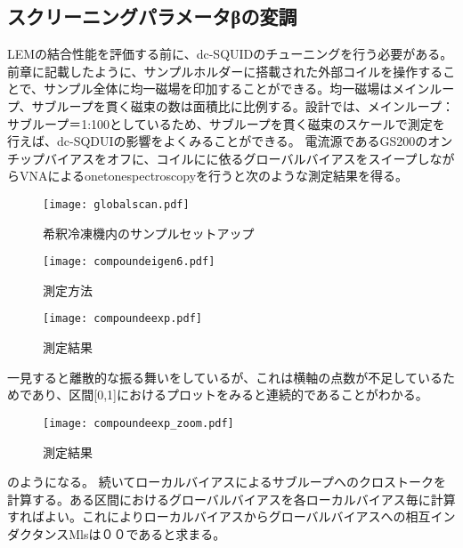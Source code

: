         \subsection{スクリーニングパラメータβの変調}
        LEMの結合性能を評価する前に、dc-SQUIDのチューニングを行う必要がある。前章に記載したように、サンプルホルダーに搭載された外部コイルを操作することで、サンプル全体に均一磁場を印加することができる。均一磁場はメインループ、サブループを貫く磁束の数は面積比に比例する。設計では、メインループ：サブループ＝1:100としているため、サブループを貫く磁束のスケールで測定を行えば、dc-SQDUIの影響をよくみることができる。
        電流源であるGS200のオンチップバイアスをオフに、コイルにに依るグローバルバイアスをスイープしながらVNAによるonetonespectroscopyを行うと次のような測定結果を得る。
        \begin{figure}[H]
            \begin{minipage}[t]{0.5\columnwidth}
                \centering
                \texttt{[image: globalscan.pdf]}
                \caption{希釈冷凍機内のサンプルセットアップ}
            \end{minipage}%
            \begin{minipage}[t]{0.5\columnwidth}
                \centering
                \texttt{[image: compoundeigen6.pdf]}
                \caption{測定方法}
            \end{minipage}
        \end{figure}
        
        \begin{figure}[H]
            \centering
            \texttt{[image: compoundeexp.pdf]}
            \caption{測定結果}
        \end{figure}
        一見すると離散的な振る舞いをしているが、これは横軸の点数が不足しているためであり、区間[0,1]におけるプロットをみると連続的であることがわかる。
        \begin{figure}[H]
            \centering
            \texttt{[image: compoundeexp\_zoom.pdf]}
            \caption{測定結果}
        \end{figure}
        のようになる。
        続いてローカルバイアスによるサブループへのクロストークを計算する。ある区間におけるグローバルバイアスを各ローカルバイアス毎に計算すればよい。これによりローカルバイアスからグローバルバイアスへの相互インダクタンスMlsは００であると求まる。
